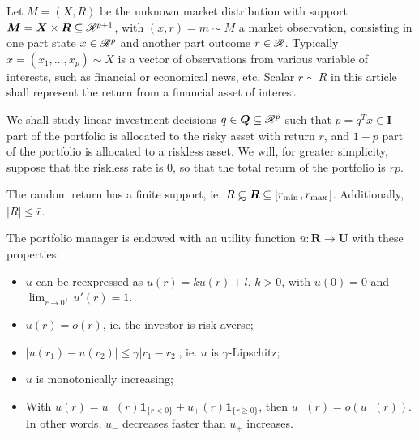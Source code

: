 \documentclass[11pt]{article}
\begin{document}
Let $M=(X,R)$ be the unknown market distribution with support
$\bm M = \bm X\times \bm R \subseteq\mathscr{R}^{p+1}$, with $(x,r) = m\sim M$ a market
observation, consisting in one part state $x\in\mathscr{R}^p$ and another part outcome
$r\in\mathscr{R}$. Typically $x=(x_1,\dots,x_p)\sim X$ is a vector of observations from various
variable of interests, such as financial or economical news, etc. Scalar $r\sim R$ in this
article shall represent the return from a financial asset of interest. 


We shall study linear investment decisions $q\in\bm Q\subseteq\mathscr{R}^p$ such that
$p=q^Tx\in\bm I$ part of the portfolio is allocated to the risky asset with return $r$,
and $1-p$ part of the portfolio is allocated to a riskless asset. We will, for greater
simplicity, suppose that the riskless rate is $0$, so that the total return of the
portfolio is $rp$. 



\begin{assumption}
  The random return has a finite support, ie.
  $R\subsetsim \bm R \subseteq [r_{\min{}},r_{\max{}}]$. Additionally, $|R|\leq \bar r$.
\end{assumption}

\begin{assumption}
  The portfolio manager is endowed with an utility function $\bar u:\bm R\to \bm U$ with
  these properties:
  \begin{itemize}[noitemsep,topsep=0pt]
  \item $\bar u$ can be reexpressed as $\bar u(r) = ku(r) + l$, $k>0$, with $u(0) = 0$ and
    $\lim_{r\to0^+}u'(r) = 1$.
  \item $u(r) = o(r)$, ie. the investor is risk-averse;
  \item $|u(r_1) - u(r_2)| \leq \gamma|r_1-r_2|$, ie. $u$ is $\gamma$-Lipschitz;
  \item $u$ is monotonically increasing;
  \item With $u(r) = u_-(r)\bm1_{\{r<0\}}+u_+(r)\bm 1_{\{r\geq0\}}$, then $u_+(r) =
    o(u_-(r))$. In other words, $u_-$ decreases faster than $u_+$ increases. 
  \end{itemize}
\end{assumption}
\end{document}
